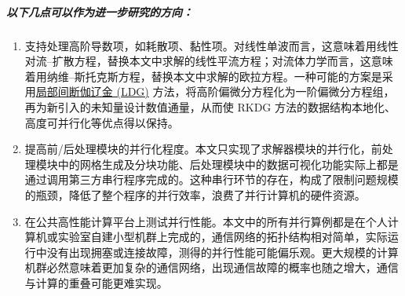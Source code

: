 \subparagraph{以下几点可以作为进一步研究的方向：}
\begin{enumerate}[wide]
\item 支持处理高阶导数项，如耗散项、黏性项。对线性单波而言，这意味着用线性对流--扩散方程，替换本文中求解的线性平流方程；对流体力学而言，这意味着用纳维--斯托克斯方程，替换本文中求解的欧拉方程。一种可能的方案是采用\uline{局部间断伽辽金
(LDG)} 方法，将高阶偏微分方程化为一阶偏微分方程组，再为新引入的未知量设计数值通量，从而使 RKDG 方法的数据结构本地化、高度可并行化等优点得以保持。
\item 提高前/后处理模块的并行化程度。本文只实现了求解器模块的并行化，前处理模块中的网格生成及分块功能、后处理模块中的数据可视化功能实际上都是通过调用第三方串行程序完成的。这种串行环节的存在，构成了限制问题规模的瓶颈，降低了整个程序的并行效率，浪费了并行计算机的硬件资源。
\item 在公共高性能计算平台上测试并行性能。本文中的所有并行算例都是在个人计算机或实验室自建小型机群上完成的，通信网络的拓扑结构相对简单，实际运行中没有出现拥塞或连接故障，测得的并行性能可能偏乐观。更大规模的计算机群必然意味着更加复杂的通信网络，出现通信故障的概率也随之增大，通信与计算的重叠可能更难实现。
\end{enumerate}
